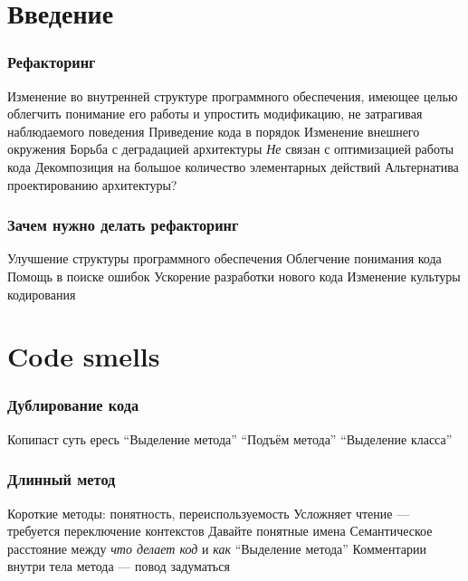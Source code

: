 \documentclass{../../slides-style}
\begin{document}
    \begin{frame}[plain]
        \titlepage
    \end{frame}

    \section{Введение}

    \begin{frame}
        \frametitle{Рефакторинг}
        \begin{outline}
            \1 Изменение во внутренней структуре программного обеспечения, имеющее целью облегчить понимание его работы и упростить модификацию, не затрагивая наблюдаемого поведения
                \2 Приведение кода в порядок
                \2 Изменение внешнего окружения
                \2 Борьба с деградацией архитектуры
                \2 \emph{Не} связан с оптимизацией работы кода
            \1 Декомпозиция на большое количество элементарных действий
            \1 Альтернатива проектированию архитектуры?
        \end{outline}
    \end{frame}

    \begin{frame}
        \frametitle{Зачем нужно делать рефакторинг}
        \begin{outline}
            \1 Улучшение структуры программного обеспечения
            \1 Облегчение понимания кода
            \1 Помощь в поиске ошибок
            \1 Ускорение разработки нового кода
            \1 Изменение культуры кодирования
        \end{outline}
    \end{frame}

    \section{Code smells}

    \begin{frame}
        \frametitle{Дублирование кода}
        \begin{outline}
            \1 Копипаст суть ересь
            \1 ``Выделение метода''
            \1 ``Подъём метода''
            \1 ``Выделение класса''
        \end{outline}
    \end{frame}

    \begin{frame}
        \frametitle{Длинный метод}
        \begin{outline}
            \1 Короткие методы: понятность, переиспользуемость
            \1 Усложняет чтение --- требуется переключение контекстов
                \2 Давайте понятные имена
            \1 Семантическое расстояние между \emph{что делает код} и \emph{как}
            \1 ``Выделение метода''
            \1 Комментарии внутри тела метода --- повод задуматься
        \end{outline}
    \end{frame}
\end{document}
